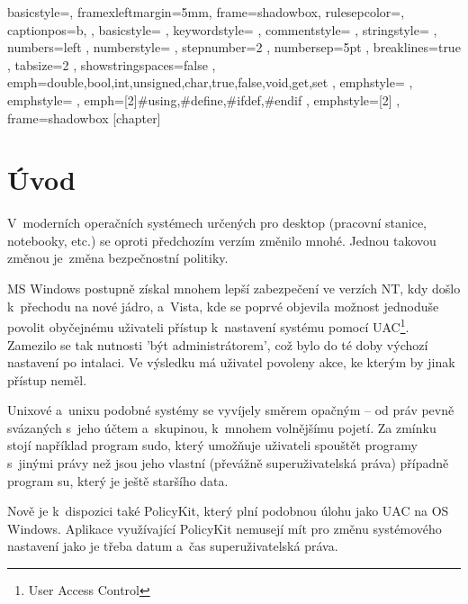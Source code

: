 \renewcommand*\lstlistingname{Výpis}
\setlength{\parskip}{3pt plus 1pt minus 1pt}
\lstset
{
    basicstyle=\footnotesize,
    framexleftmargin=5mm,
    frame=shadowbox,
    rulesepcolor=\color{blue},
    captionpos=b,
, basicstyle=\footnotesize\ttfamily
, keywordstyle=\color{blue}
, commentstyle=\color{OliveGreen}
, stringstyle=\color{Maroon}
, numbers=left
, numberstyle=\scriptsize
, stepnumber=2
, numbersep=5pt
, breaklines=true
, tabsize=2
, showstringspaces=false
, emph={double,bool,int,unsigned,char,true,false,void,get,set}
, emphstyle=\color{blue}
, emphstyle=\color{red}
, emph={[2]\#using,\#define,\#ifdef,\#endif}
, emphstyle={[2]\color{blue}}
, frame=shadowbox
}
[chapter]
\newcommand{\cppc}[1]{\lstinline[language=C++]$#1$}

\chapter{Úvod}
V~moderních operačních systémech určených pro desktop (pracovní stanice, notebooky, etc.) se oproti předchozím verzím změnilo mnohé. Jednou takovou změnou je~změna bezpečnostní politiky.

MS Windows postupně získal mnohem lepší zabezpečení ve verzích NT, kdy došlo k~přechodu na nové jádro, a~Vista, kde se poprvé objevila možnost jednoduše povolit obyčejnému uživateli přístup k~nastavení systému pomocí UAC\footnote{User Access Control}. Zamezilo se tak nutnosti 'být administrátorem', což bylo do té doby výchozí nastavení po intalaci. Ve výsledku má uživatel povoleny akce, ke kterým by jinak přístup neměl.

Unixové a~unixu podobné systémy se vyvíjely směrem opačným -- od práv pevně svázaných s~jeho účtem a~skupinou, k~mnohem volnějšímu pojetí. Za zmínku stojí například program sudo, který umožňuje uživateli spouštět programy s~jinými právy než jsou jeho vlastní (převážně superuživatelská práva) případně program su, který je ještě staršího data.

Nově je k~dispozici také PolicyKit, který plní podobnou úlohu jako UAC na OS Windows. Aplikace využívající PolicyKit nemusejí mít pro změnu systémového nastavení jako je třeba datum a~čas superuživatelská práva.

